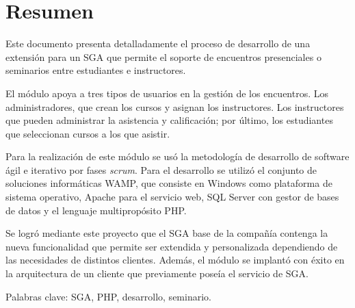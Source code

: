 \chapter*{Resumen}

Este documento presenta detalladamente el proceso de desarrollo de una extensión para un \gls{SGA} que permite el soporte de encuentros presenciales o seminarios entre estudiantes e instructores. 

El módulo apoya a tres tipos de usuarios en la gestión de los encuentros. Los administradores, que crean los cursos y asignan los instructores. Los instructores que pueden administrar la asistencia y calificación; por último, los estudiantes que seleccionan cursos a los que asistir.

Para la realización de este módulo se usó la metodología de desarrollo de software ágil e iterativo por fases \emph{scrum}. Para el desarrollo se utilizó el conjunto de soluciones informáticas \gls{WAMP}, que consiste en Windows como plataforma de sistema operativo, Apache para el servicio web, \gls{SQL} Server con gestor de bases de datos y el lenguaje multipropósito PHP.

Se logró mediante este proyecto que el SGA base de la compañía contenga la nueva funcionalidad que permite ser extendida y personalizada dependiendo de las necesidades de distintos clientes. Además, el módulo se implantó con éxito en la arquitectura de un cliente que previamente poseía el servicio de \gls{SGA}.

Palabras clave: \gls{SGA}, \gls{PHP}, desarrollo, seminario.




